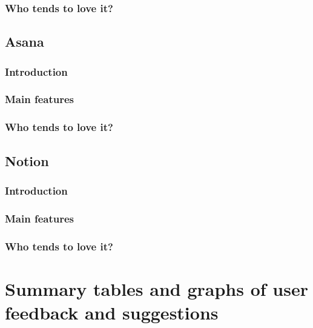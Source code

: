 \documentclass[
]{book}
\begin{document}
\hypertarget{who-tends-to-love-it-10}{%
\subsection{Who tends to love it?}\label{who-tends-to-love-it-10}}

\hypertarget{asana}{%
\section{Asana}\label{asana}}

\hypertarget{introduction-12}{%
\subsection{Introduction}\label{introduction-12}}

\hypertarget{main-features-11}{%
\subsection{Main features}\label{main-features-11}}

\hypertarget{who-tends-to-love-it-11}{%
\subsection{Who tends to love it?}\label{who-tends-to-love-it-11}}

\hypertarget{notion}{%
\section{Notion}\label{notion}}

\hypertarget{introduction-13}{%
\subsection{Introduction}\label{introduction-13}}

\hypertarget{main-features-12}{%
\subsection{Main features}\label{main-features-12}}

\hypertarget{who-tends-to-love-it-12}{%
\subsection{Who tends to love it?}\label{who-tends-to-love-it-12}}

\hypertarget{summary-tables-and-graphs-of-user-feedback-and-suggestions}{%
\chapter{Summary tables and graphs of user feedback and suggestions}\label{summary-tables-and-graphs-of-user-feedback-and-suggestions}}
\end{document}
